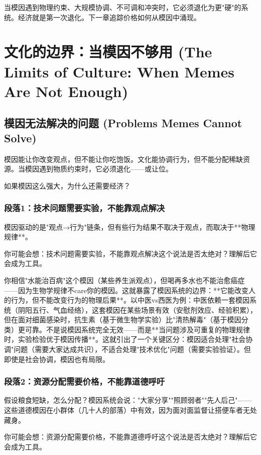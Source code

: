 \documentclass[openany, a4paper, 12pt]{book}
\newenvironment{motivation}{
	\vspace{0.5em}
	\begin{tcolorbox}[
		colback=gray!10,           %
		colframe=gray!60,          %
		title=\textit{本章动机 (Motivation)},
		fonttitle=\bfseries,
		arc=0mm,                   %
		leftrule=3mm               %
		]
		\small \itshape %
	}{
	\end{tcolorbox}
	\vspace{1em}
}
\begin{document}
\begin{motivation}
\begin{motivation}
\begin{motivation}
当模因遇到物理约束、大规模协调、不可调和冲突时，它必须退化为更"硬"的系统。经济就是第一次退化。下一章追踪价格如何从模因中涌现。


	
	\section{文化的边界：当模因不够用 (The Limits of Culture: When Memes Are Not Enough)}

	\subsection{模因无法解决的问题 (Problems Memes Cannot Solve)}
	\begin{motivation}
		模因能让你改变观点，但不能让你吃饱饭。文化能协调行为，但不能分配稀缺资源。当模因遇到物质约束时，它必须退化——或让位。
	\end{motivation}
	\begin{questionbox}
		如果模因这么强大，为什么还需要经济？
	\end{questionbox}

	\subsubsection*{段落1：技术问题需要实验，不能靠观点解决}
	模因驱动的是"观点→行为"链条，但有些行为结果不取决于观点，而取决于**物理规律**。
	\begin{tcolorbox}[colback=yellow!5, title=\textit{读者行为预测}]
		你可能会想：技术问题需要实验，不能靠观点解决这个说法是否太绝对？理解后它会成为工具。
	\end{tcolorbox}

你相信"水能治百病"这个模因（某些养生派观点），但喝再多水也不能治愈癌症——因为生物学规律不care你的模因。这就暴露了模因系统的边界：**它能改变人的行为，但不能改变行为的物理后果**。以中医vs西医为例：中医依赖一套模因系统（阴阳五行、气血经络），这套模因在某些场景有效（安慰剂效应、经验积累），但在面对细菌感染时，抗生素（基于微生物学实验）比"清热解毒"（基于模因分类）更可靠。不是说模因系统完全无效——而是**当问题涉及可重复的物理规律时，实验检验优于模因传播**。这就引出了一个关键区分：模因适合处理"社会协调"问题（需要大家达成共识），不适合处理"技术优化"问题（需要实验验证）。但即使是社会协调，模因也有局限。

	\subsubsection*{段落2：资源分配需要价格，不能靠道德呼吁}
	假设粮食短缺，怎么分配？模因系统会说："大家分享""照顾弱者""先人后己"——这些道德模因在小群体（几十人的部落）中有效，因为面对面监督让搭便车者无处藏身。
	\begin{tcolorbox}[colback=yellow!5, title=\textit{读者行为预测}]
		你可能会想：资源分配需要价格，不能靠道德呼吁这个说法是否太绝对？理解后它会成为工具。
	\end{tcolorbox}


\end{motivation}
\end{motivation}
\end{motivation}
\end{document}
